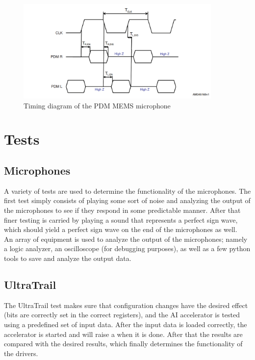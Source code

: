 \begin{figure}[htb]
    \centering
    \includegraphics[width=0.9\textwidth]{figures/pdm_timing.png}
    \caption[Timing diagram of the MP34DT01-M PDM MEMS mic \cite{pdm_mic_datasheet}]{Timing diagram of the PDM MEMS microphone}
    \label{fig:pdm_timing}
\end{figure}

\section{Tests}

\subsection{Microphones}

A variety of tests are used to determine the functionality of the microphones.
The first test simply consists of playing some sort of noise and analyzing the output of the microphones to see if
they respond in some predictable manner.
After that finer testing is carried by playing a sound that represents a perfect sign wave,
which should yield a perfect sign wave on the end of the microphones as well.\\
An array of equipment is used to analyze the output of the microphones; namely a logic analyzer, an oscilloscope
(for debugging purposes), as well as a few python tools to save and analyze the output data.

\subsection{UltraTrail}

The UltraTrail test makes sure that configuration changes have the desired effect (bits are correctly set in the correct registers),
and the AI accelerator is tested using a predefined set of input data.
After the input data is loaded correctly, the accelerator is started and will raise a  when it is done.
After that the results are compared with the desired results, which finally determines the functionality of the drivers.
